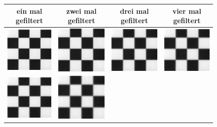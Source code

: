 \documentclass[12pt,german]{article}
\begin{document}
\begin{figure} [H]
  \centering
  \begin{tabular}{| c | c | c | c |}
    \hline
    ein mal gefiltert & zwei mal gefiltert & drei mal gefiltert & vier mal gefiltert \\
    \hline
	\includegraphics[width=3cm]{../testData/Gauss/SchachbrettR4S4v1.jpg} & 	
	\includegraphics[width=3cm]{../testData/Gauss/SchachbrettR4S4v2.jpg} &
	\includegraphics[width=3cm]{../testData/Gauss/SchachbrettR4S4v3.jpg} & 	
	\includegraphics[width=3cm]{../testData/Gauss/SchachbrettR4S4v4.jpg} \\
	    \hline
	\includegraphics[width=3cm]{../testData/Gauss/SchachbrettR40S4v1.jpg} & 	
	\includegraphics[width=3cm]{../testData/Gauss/SchachbrettR40S4v2.jpg} &

\end{tabular}
\end{figure}
\end{document}
